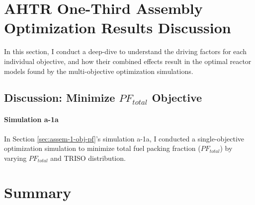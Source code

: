 \section{AHTR One-Third Assembly Optimization Results Discussion}
\label{sec:assem-discussion}
In this section, I conduct a deep-dive to understand the driving factors for 
each individual objective, and how their combined effects result in the optimal 
reactor models found by the multi-objective optimization simulations. 

\subsection{Discussion: Minimize $PF_{total}$ Objective}
\label{sec:assem-discussion-pf}
\paragraph{Simulation a-1a}
In Section \ref{sec:assem-1-obj-pf}'s simulation a-1a, I conducted a single-objective 
optimization simulation to minimize total fuel packing fraction ($PF_{total}$) by 
varying $PF_{total}$ and TRISO distribution. 

\section{Summary}